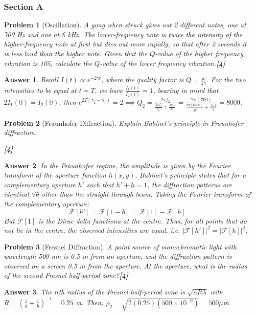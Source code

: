 \documentclass[a4paper]{article}
\newtheorem{ans}{Answer}[subsection]
\theoremstyle{new}
\newtheorem{qns}{Problem}[subsection]
\begin{document}
\subsubsection{Section A}
\begin{qns}[Oscillation]
A gong when struck gives out 2 different notes, one at 700 Hz and one at 6 kHz. The lower-frequency note is twice the intensity of the higher-frequency note at first but dies out more rapidly, so that after 2 seconds it is less loud than the higher note. Given that the $Q$-value of the higher frequency vibration is 105, calculate the $Q$-value of the lower frequency vibration.\hfill\textbf{[4]}
\end{qns}
\begin{ans}
Recall $I(t)\propto e^{-2\gamma t}$, where the quality factor is $Q=\frac{\omega}{2\gamma}$. For the two intensities to be equal at $t=T$, we have $\frac{I_1(t)}{I_2(t)}=1$, bearing in mind that $2I_1(0)=I_2(0)$, then $e^{2T(\gamma_2-\gamma_1)}=2\implies Q_2=\frac{2\pi f_2}{\frac{2\pi f_1}{Q_1}+\frac{\ln 2}{2T}}=\frac{2\pi(700)}{\frac{2\pi(6000)}{10^5}+\frac{\ln 2}{4}}=8000$.
\end{ans}
\begin{qns}[Fraunhofer Diffraction]
Explain Babinet’s principle in Fraunhofer diffraction.

\hfill\textbf{[4]}
\end{qns}
\begin{ans}
In the Fraunhofer regime, the amplitude is given by the Fourier transform of the aperture function $h(x,y)$. Babinet's principle states that for a complementary aperture $h'$ such that $h'+h=1$, the diffraction patterns are identical $\forall\theta$ other than the straight-through beam. Taking the Fourier transform of the complementary aperture:
$$\mathcal{F}[h']=\mathcal{F}[1-h]=\mathcal{F}[1]-\mathcal{F}[h]$$
But $\mathcal{F}[1]$ is the Dirac delta functiona at the centre. Thus, for all points that do not lie in the centre, the observed intensities are equal, i.e. $|\mathcal{F}[h']|^2=|\mathcal{F}[h]|^2$.
\end{ans}
\begin{qns}[Fresnel Diffraction]
A point source of monochromatic light with wavelength 500 nm is 0.5 m from an aperture, and the diffraction pattern is observed on a screen 0.5 m from the aperture. At the aperture, what is the radius of the second Fresnel half-period zone?\hfill\textbf{[4]}
\end{qns}
\begin{ans}
The $n$th radius of the Fresnel half-period zone is $\sqrt{nR\lambda}$ with $R=(\frac{1}{a}+\frac{1}{b})^{-1}=0.25$ m. Then, $\rho_2=\sqrt{2(0.25)(500\times10^{-9})}=500\mu$m.
\end{ans}
\end{document}
